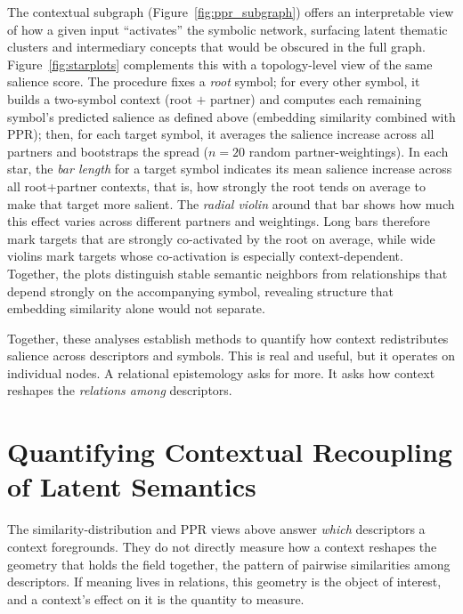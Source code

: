 \documentclass[final,creativeai]{article}
\begin{document}
The contextual subgraph (Figure~\ref{fig:ppr_subgraph}) offers an interpretable view of how a given input ``activates'' the symbolic network, surfacing latent thematic clusters and intermediary concepts that would be obscured in the full graph. Figure~\ref{fig:starplots} complements this with a topology-level view of the same salience score. The procedure fixes a \emph{root} symbol; for every other symbol, it builds a two-symbol context (root $+$ partner) and computes each remaining symbol's predicted salience as defined above (embedding similarity combined with PPR); then, for each target symbol, it averages the salience increase across all partners and bootstraps the spread ($n=20$ random partner-weightings). In each star, the \emph{bar length} for a target symbol indicates its mean salience increase across all root+partner contexts, that is, how strongly the root tends on average to make that target more salient. The \emph{radial violin} around that bar shows how much this effect varies across different partners and weightings. Long bars therefore mark targets that are strongly co-activated by the root on average, while wide violins mark targets whose co-activation is especially context-dependent. Together, the plots distinguish stable semantic neighbors from relationships that depend strongly on the accompanying symbol, revealing structure that embedding similarity alone would not separate.

Together, these analyses establish methods to quantify how context redistributes salience across descriptors and symbols. This is real and useful, but it operates on individual nodes. A relational epistemology asks for more. It asks how context reshapes the \emph{relations among} descriptors.

\FloatBarrier
\section{Quantifying Contextual Recoupling of Latent Semantics}
\label{sec:delta}
The similarity-distribution and PPR views above answer \emph{which} descriptors a context foregrounds. They do not directly measure how a context reshapes the geometry that holds the field together, the pattern of pairwise similarities among descriptors. If meaning lives in relations, this geometry is the object of interest, and a context's effect on it is the quantity to measure.
\end{document}
